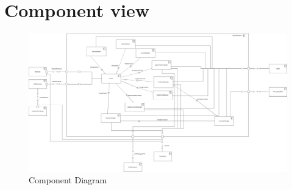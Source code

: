     \section{Component view}
    \begin{figure}[H]
        \includegraphics[scale=0.19,angle=90]{dd/resources/images/ComponentDiagram.png}
        \caption{Component Diagram}        
    \end{figure}
